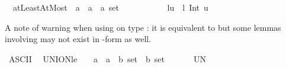 \begin{isabellebody}
\isanewline
\ \ atLeastAtMost\ {\isacharcolon}{\kern0pt}{\isacharcolon}{\kern0pt}\ {\isachardoublequoteopen}{\isacharprime}{\kern0pt}a\ {\isacharequal}{\kern0pt}{\isachargreater}{\kern0pt}\ {\isacharprime}{\kern0pt}a\ {\isacharequal}{\kern0pt}{\isachargreater}{\kern0pt}\ {\isacharprime}{\kern0pt}a\ set{\isachardoublequoteclose}\ \ \ \ \ \ \ \ {\isacharparenleft}{\kern0pt}{\isachardoublequoteopen}{\isacharparenleft}{\kern0pt}{}{\isacharbraceleft}{\kern0pt}{\isacharunderscore}{\kern0pt}{\isachardot}{\kern0pt}{\isachardot}{\kern0pt}{\isacharunderscore}{\kern0pt}{\isacharbraceright}{\kern0pt}{\isacharparenright}{\kern0pt}{\isachardoublequoteclose}{\isacharparenright}{\kern0pt}\ \isanewline
\ \ {\isachardoublequoteopen}{\isacharbraceleft}{\kern0pt}l{\isachardot}{\kern0pt}{\isachardot}{\kern0pt}u{\isacharbraceright}{\kern0pt}\ {\isacharequal}{\kern0pt}{\isacharequal}{\kern0pt}\ {\isacharbraceleft}{\kern0pt}l{\isachardot}{\kern0pt}{\isachardot}{\kern0pt}{\isacharbraceright}{\kern0pt}\ Int\ {\isacharbraceleft}{\kern0pt}{\isachardot}{\kern0pt}{\isachardot}{\kern0pt}u{\isacharbraceright}{\kern0pt}{\isachardoublequoteclose}\isanewline
\isanewline
{}\isamarkupfalse%
%
\begin{isamarkuptext}%
A note of warning when using  on type : it is equivalent to  but some lemmas involving
 may not exist in -form as well.%
\end{isamarkuptext}\isamarkuptrue%
\isamarkupfalse%
\ {\isacharparenleft}{\kern0pt}ASCII{\isacharparenright}{\kern0pt}\isanewline
\ \ {\isachardoublequoteopen}{\isacharunderscore}{\kern0pt}UNION{\isacharunderscore}{\kern0pt}le{\isachardoublequoteclose}\ \ \ {\isacharcolon}{\kern0pt}{\isacharcolon}{\kern0pt}\ {\isachardoublequoteopen}{\isacharprime}{\kern0pt}a\ {\isacharequal}{\kern0pt}{\isachargreater}{\kern0pt}\ {\isacharprime}{\kern0pt}a\ {\isacharequal}{\kern0pt}{\isachargreater}{\kern0pt}\ {\isacharprime}{\kern0pt}b\ set\ {\isacharequal}{\kern0pt}{\isachargreater}{\kern0pt}\ {\isacharprime}{\kern0pt}b\ set{\isachardoublequoteclose}\ \ \ \ \ \ \ {\isacharparenleft}{\kern0pt}{\isachardoublequoteopen}{\isacharparenleft}{\kern0pt}{}UN\ {\isacharunderscore}{\kern0pt}{\isacharless}{\kern0pt}{\isacharequal}{\kern0pt}{\isacharunderscore}{\kern0pt}{\isachardot}{\kern0pt}{\isacharslash}{\kern0pt}\ {\isacharunderscore}{\kern0pt}{\isacharparenright}{\kern0pt}{\isachardoublequoteclose}\ {\isacharbrackleft}{\kern0pt}{}{\isacharcomma}{\kern0pt}\ {}{\isacharcomma}{\kern0pt}\ {}{}{\isacharbrackright}{\kern0pt}\ {}{}{\isacharparenright}{\kern0pt}\isanewline

\end{isabellebody}
